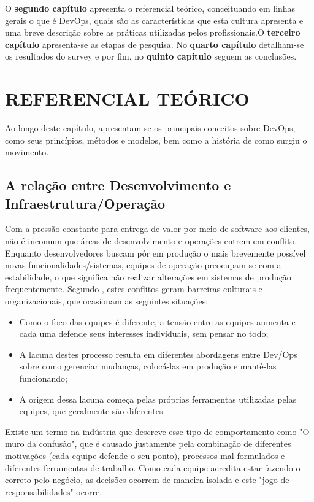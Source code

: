 \documentclass[twoside,english,brazilian]{UNISINOSartigo}
\begin{document}
O \textbf{segundo capítulo} apresenta o referencial teórico, conceituando em linhas gerais o que é DevOps, quais são as características que esta cultura apresenta e uma breve descrição sobre as práticas utilizadas pelos profissionais.O \textbf{terceiro capítulo} apresenta-se as etapas de pesquisa. No \textbf{quarto capítulo} detalham-se os resultados do survey e por fim, no \textbf{quinto capítulo} seguem as conclusões.
\section{REFERENCIAL TEÓRICO}
	Ao longo deste capítulo, apresentam-se os principais conceitos sobre DevOps, como seus princípios, métodos e modelos, bem como a história de como surgiu o movimento.

\subsection{A relação entre Desenvolvimento  e Infraestrutura/Operação}

Com a pressão constante para entrega de valor por meio de software aos clientes, não é incomum que áreas de desenvolvimento e operações entrem em conflito. Enquanto desenvolvedores buscam pôr em produção o mais brevemente possível novas funcionalidades/sistemas, equipes de operação preocupam-se com a estabilidade, o que significa não realizar alterações em sistemas de produção frequentemente.
Segundo , estes conflitos geram barreiras culturais e organizacionais, que ocasionam as seguintes situações:

\begin{itemize}
\item Como o foco das equipes é diferente, a tensão entre as equipes aumenta e cada uma defende seus interesses individuais, sem pensar no todo;
\item A lacuna destes processo resulta em diferentes abordagens entre Dev/Ops sobre como gerenciar mudanças, colocá-las em produção e mantê-las funcionando;
\item  A origem dessa lacuna começa pelas próprias ferramentas utilizadas pelas equipes, que geralmente são diferentes.
\end{itemize}

Existe um termo na indústria que descreve esse tipo de comportamento como "O muro da confusão", que é causado justamente pela combinação de diferentes motivações (cada equipe defende o seu ponto), processos mal formulados e diferentes ferramentas de trabalho. Como cada equipe acredita estar fazendo o correto pelo negócio, as decisões ocorrem de maneira isolada e este "jogo de responsabilidades" ocorre.
\end{document}
